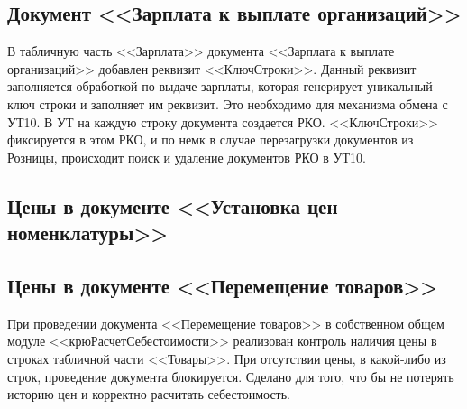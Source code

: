 \subsection{Документ <<Зарплата к выплате организаций>>}\label{1011}
В табличную часть <<Зарплата>> документа <<Зарплата к выплате организаций>> добавлен реквизит <<КлючСтроки>>. Данный реквизит заполняется обработкой по выдаче зарплаты, которая генерирует уникальный ключ строки и заполняет им реквизит. Это необходимо для механизма обмена с УТ10. В УТ на каждую строку документа создается РКО. <<КлючСтроки>> фиксируется в этом РКО, и по немк в случае перезагрузки документов из Розницы, происходит поиск и удаление документов РКО в УТ10.

\subsection{Цены в документе <<Установка цен номенклатуры>>}\label{1012}

\subsection{Цены в документе <<Перемещение товаров>>}\label{1014}
При проведении документа <<Перемещение товаров>> в собственном общем модуле <<крюРасчетСебестоимости>>
реализован контроль наличия цены в строках табличной части <<Товары>>. При отсутствии цены, в какой-либо из строк, проведение документа блокируется.
Сделано для того, что бы не потерять историю цен и корректно расчитать себестоимость.